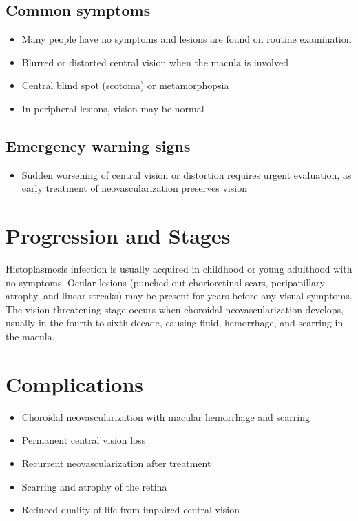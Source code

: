 \subsection{Common symptoms}
\begin{itemize}[noitemsep]
  \item Many people have no symptoms and lesions are found on routine examination
  \item Blurred or distorted central vision when the macula is involved
  \item Central blind spot (scotoma) or metamorphopsia
  \item In peripheral lesions, vision may be normal
\end{itemize}
\subsection{Emergency warning signs}
\begin{itemize}[noitemsep]
  \item Sudden worsening of central vision or distortion requires urgent evaluation, as early treatment of neovascularization preserves vision
\end{itemize}
\section{Progression and Stages}
Histoplasmosis infection is usually acquired in childhood or young adulthood with no symptoms. Ocular lesions (punched-out chorioretinal scars, peripapillary atrophy, and linear streaks) may be present for years before any visual symptoms. The vision-threatening stage occurs when choroidal neovascularization develops, usually in the fourth to sixth decade, causing fluid, hemorrhage, and scarring in the macula.
\section{Complications}
\begin{itemize}[noitemsep]
  \item Choroidal neovascularization with macular hemorrhage and scarring
  \item Permanent central vision loss
  \item Recurrent neovascularization after treatment
  \item Scarring and atrophy of the retina
  \item Reduced quality of life from impaired central vision
\end{itemize}
